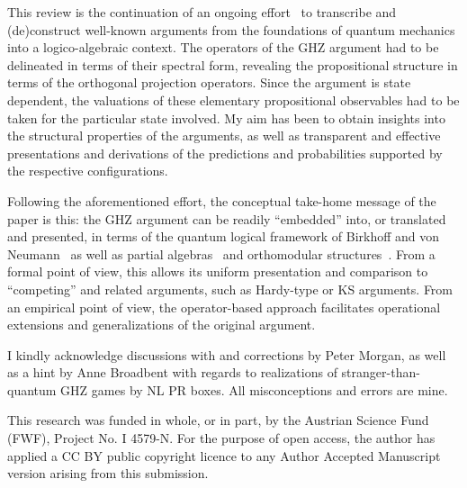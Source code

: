 \documentclass[sn-mathphys]{sn-jnl}%
\theoremstyle{thmstyleone}%
\theoremstyle{thmstyletwo}%
\theoremstyle{thmstylethree}%
\begin{document}
This review is the continuation of an ongoing effort~\cite{svozil-2017-b,svozil-2020-hardy}
to transcribe and (de)construct well-known arguments from the foundations of quantum mechanics into a logico-algebraic context.
The operators of the GHZ argument had to be delineated in terms of their spectral form, revealing the propositional structure in terms of the
orthogonal projection operators. Since the argument is state dependent, the valuations of these elementary propositional observables
had to be taken for the particular state involved.
My aim has been to obtain insights into the structural properties of the arguments,
as well as transparent and effective presentations and derivations
of the predictions and probabilities supported by the respective configurations.

Following the aforementioned effort, the conceptual take-home message of the paper is this: the GHZ argument can be readily ``embedded'' into,
or translated and presented, in terms of the quantum logical framework of Birkhoff and von Neumann~\cite{birkhoff-36}
as well as partial algebras~\cite{kochen2,kochen3,specker-ges} and orthomodular structures~\cite{kalmbach-83,pulmannova-91}.
From a formal point of view, this allows its uniform presentation and comparison to ``competing'' and related arguments,
such as Hardy-type or KS arguments.
From an empirical point of view, the operator-based approach facilitates operational extensions and generalizations of the original argument.



\backmatter



I kindly acknowledge discussions with and corrections by Peter Morgan, as well as a hint by Anne Broadbent with regards to realizations of stranger-than-quantum GHZ games by NL PR boxes.
All misconceptions and errors are mine.


This research was funded in whole, or in part, by the Austrian Science Fund (FWF), Project No. I 4579-N. For the purpose of open access, the author has applied a CC BY public copyright licence to any Author Accepted Manuscript version arising from this submission.

\end{document}
